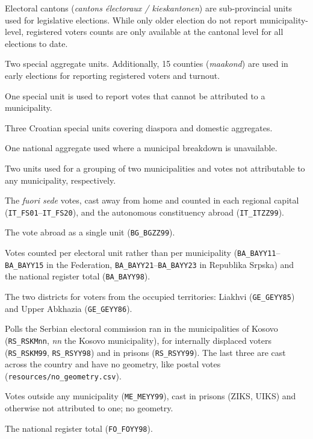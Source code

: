 \begin{description}[leftmargin=1.5cm, style=sameline]
  \item[BE] Electoral cantons (\textit{cantons \'electoraux / kieskantonen})
            are sub-provincial units used for legislative elections.
            While only older election do not report municipality-level,
            registered voters counts are only available at the cantonal level for
            all elections to date.
  \item[EE] Two special aggregate units. Additionally, 15 counties (\textit{maakond})
            are used in early elections for reporting registered voters and turnout.
  \item[EL] One special unit is used to report votes that cannot be attributed to a municipality.
  \item[HR] Three Croatian special units covering diaspora and domestic
            aggregates.
  \item[LT] One national aggregate used where a municipal breakdown is
            unavailable.
  \item[PT] Two units used for a grouping of two municipalities and votes
            not attributable to any municipality, respectively.
  \item[IT] The \textit{fuori sede} votes, cast away from home and counted
            in each regional capital (\texttt{IT\_FS01}--\texttt{IT\_FS20}),
            and the autonomous constituency abroad (\texttt{IT\_ITZZ99}).
  \item[BG] The vote abroad as a single unit (\texttt{BG\_BGZZ99}).
  \item[BA] Votes counted per electoral unit rather than per municipality
            (\texttt{BA\_BAYY11}--\texttt{BA\_BAYY15} in the Federation,
            \texttt{BA\_BAYY21}--\texttt{BA\_BAYY23} in Republika Srpska) and
            the national register total (\texttt{BA\_BAYY98}).
  \item[GE] The two districts for voters from the occupied territories:
            Liakhvi (\texttt{GE\_GEYY85}) and Upper Abkhazia
            (\texttt{GE\_GEYY86}).
  \item[RS] Polls the Serbian electoral commission ran in the municipalities
            of Kosovo (\texttt{RS\_RSKMnn}, \textit{nn} the Kosovo municipality),
            for internally displaced voters (\texttt{RS\_RSKM99},
            \texttt{RS\_RSYY98}) and in prisons (\texttt{RS\_RSYY99}).
            The last three are cast across the country and have no geometry,
            like postal votes (\texttt{resources/no\_geometry.csv}).
  \item[ME] Votes outside any municipality (\texttt{ME\_MEYY99}), cast in
            prisons (ZIKS, UIKS) and otherwise not attributed to one; no
            geometry.
  \item[FO] The national register total (\texttt{FO\_FOYY98}).
\end{description}
